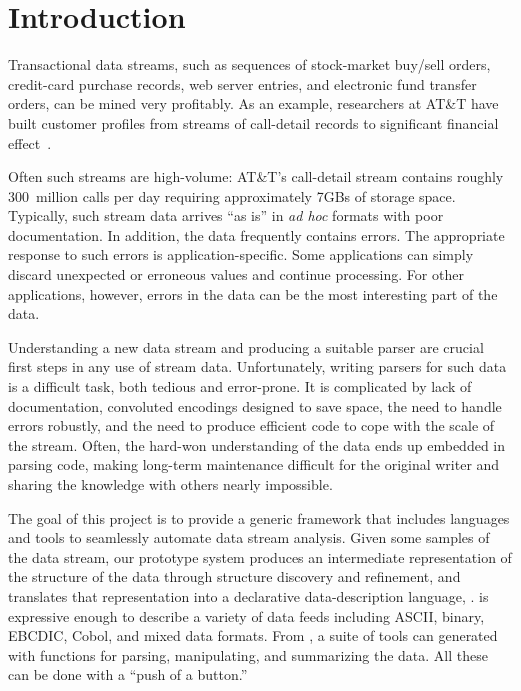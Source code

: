 \documentclass{article}
\begin{document}

\section{Introduction}
\label{intro}
Transactional data streams, such as sequences of stock-market buy/sell orders,
credit-card purchase records, web server entries, and electronic fund
transfer orders, can be mined very profitably.  As an example,
researchers at AT\&T have built customer profiles from streams of
call-detail records to significant financial effect~\cite{kdd98,kdd99,kdd00}.   

Often such streams are high-volume: AT\&T's call-detail stream contains
roughly 300~million calls per day requiring approximately 7GBs of
storage space.  Typically, such stream data arrives ``as is'' in
\textit{ad hoc} formats with poor documentation.  In addition, the
data frequently contains errors.  The appropriate response to such
errors is application-specific. Some applications can simply discard
unexpected or erroneous values and continue processing.  For other
applications, however, errors in the data can be the most interesting
part of the data.  

Understanding a new data stream and producing a suitable parser are
crucial first steps in any use of stream data.  Unfortunately, writing
parsers for such data is a difficult task, both tedious and
error-prone. It is complicated by lack of documentation, convoluted
encodings designed to save space, the need to handle errors
robustly, and the need to produce efficient code to cope with the
scale of the stream.  Often, the hard-won understanding of the data
ends up embedded in parsing code, making long-term maintenance
difficult for the original writer and sharing the knowledge with
others nearly impossible.

The goal of this project is to provide a generic framework that includes
languages and tools to seamlessly automate data stream analysis. 
Given some samples of the data stream, our prototype system produces 
an intermediate
representation of the structure of the data through structure discovery
and refinement, and translates that representation into a
declarative data-description language, \padsc{}. \padsc{} is 
expressive enough to describe a variety of data feeds 
including ASCII, binary, EBCDIC, Cobol, and mixed data formats.  
From \padsc{}, a suite of tools can generated with functions for 
parsing, manipulating, and summarizing the data. All these can be 
done with a ``push of a button.''   
\end{document}
